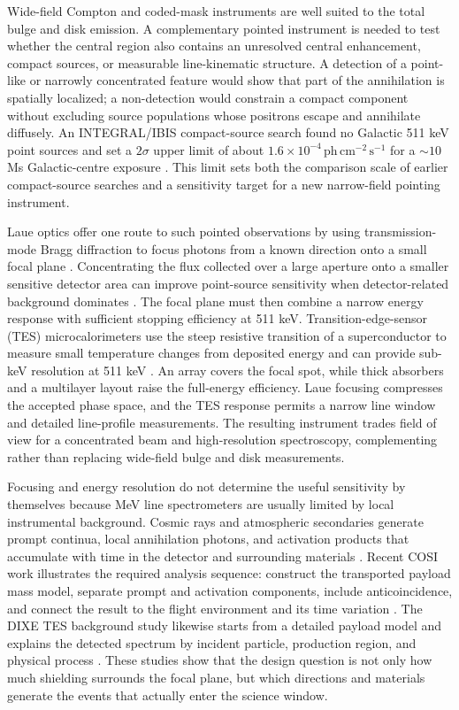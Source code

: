 \documentclass[11pt]{article}
\newcommand{\phcms}{\ensuremath{\,\mathrm{ph\,cm^{-2}\,s^{-1}}}}
\begin{document}
Wide-field Compton and coded-mask instruments are well suited to the total
bulge and disk emission. A complementary pointed instrument is needed to test
whether the central region also contains an unresolved central enhancement,
compact sources, or measurable line-kinematic structure. A detection of a
point-like or narrowly concentrated feature would show that part of the
annihilation is spatially localized; a non-detection would constrain a compact
component without excluding source populations whose positrons escape and
annihilate diffusely. An INTEGRAL/IBIS compact-source search found no Galactic
511 keV point sources and set a $2\sigma$ upper limit of about
$1.6\times10^{-4}\phcms$ for a $\sim10$ Ms Galactic-centre exposure
\cite{DeCesare2011}. This limit sets both the comparison scale of earlier
compact-source searches and a sensitivity target for a new narrow-field
pointing instrument.

Laue optics offer one route to such pointed observations by using
transmission-mode Bragg diffraction to focus photons from a known direction
onto a small focal plane \cite{Barriere2009Laue,Barriere2011LauePrototype}.
Concentrating the flux collected over a large aperture onto a smaller sensitive
detector area can improve point-source sensitivity when detector-related
background dominates \cite{Weidenspointner2006MAX}. The focal plane must then
combine a narrow energy response with sufficient stopping efficiency at
511 keV. Transition-edge-sensor (TES) microcalorimeters use the steep
resistive transition of a superconductor to measure small temperature changes
from deposited energy and can provide sub-keV resolution at 511 keV
\cite{Shirazi2023,Zhang2022TESGamma}. An array covers the focal spot, while thick absorbers and a
multilayer layout raise the full-energy efficiency. Laue focusing compresses
the accepted phase space, and the TES response permits a narrow line window and
detailed line-profile measurements. The resulting instrument trades field of
view for a concentrated beam and high-resolution spectroscopy, complementing
rather than replacing wide-field bulge and disk measurements.

Focusing and energy resolution do not determine the useful sensitivity by
themselves because MeV line spectrometers are usually limited by local
instrumental background. Cosmic rays and atmospheric secondaries generate
prompt continua, local annihilation photons, and activation products that
accumulate with time in the detector and surrounding materials
\cite{Sturner2003,Gehrels1985}. Recent COSI work illustrates the required
analysis sequence: construct the transported payload mass model, separate
prompt and activation components, include anticoincidence, and connect the
result to the flight environment and its time variation
\cite{Kierans2017,Gallego2025Balloon,Gallego2025,Beechert2022,Sleator2019,Ciabattoni2025ACS}. The DIXE
TES background study likewise starts from a detailed payload model and explains
the detected spectrum by incident particle, production region, and physical
process \cite{Tian2026DIXE}. These studies show that the design question is not
only how much shielding surrounds the focal plane, but which directions and
materials generate the events that actually enter the science window.
\end{document}
